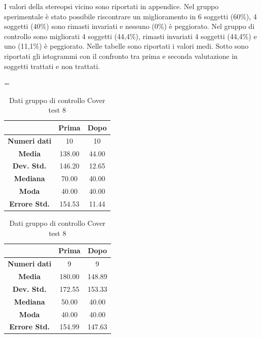 I valori della stereopsi vicino sono riportati in appendice. Nel gruppo sperimentale è stato possibile riscontrare un miglioramento in 6 soggetti (60\%), 4 soggetti (40\%) sono rimasti invariati e nessuno (0\%) è peggiorato. Nel gruppo di controllo sono migliorati 4 soggetti (44,4\%), rimasti invariati 4 soggetti (44,4\%) e uno (11,1\%) è peggiorato. Nelle tabelle sono riportati i valori medi. Sotto sono riportati gli istogrammi con il confronto tra prima e seconda valutazione in soggetti trattati e non trattati.

\begin{table}
\centering
\setlength\tabcolsep{4pt}
\begin{minipage}{0.48\textwidth}
\centering
\tablewidth=\textwidth

\begin{tabular}{|c|c|c|} \hline
{\textbf{}} & {\textbf{  \hspace{8pt}Prima\hspace{8pt} }} & {\textbf{ \hspace{8pt}Dopo\hspace{8pt}  }}\\ \hline
\textbf{Numeri dati} & 10 & 10 \\ 
\textbf{Media} & 138.00 & 44.00 \\  
\textbf{Dev. Std.} & 146.20 & 12.65 \\  
\textbf{Mediana} & 70.00 & 40.00 \\ 
\textbf{Moda} & 40.00 & 40.00 \\ 
\textbf{Errore Std.} & 154.53 & 11.44 \\ 
\hline
\end{tabular}
\caption{Dati gruppo sperimentale Cover test 8}

\label{tab:accuracy} 
\end{minipage}%
\hfill
\begin{minipage}{0.48\textwidth}
\centering

\begin{tabular}{|c|c|c|} \hline
{\textbf{}} & {\textbf{  \hspace{8pt}Prima\hspace{8pt} }} & {\textbf{ \hspace{8pt}Dopo\hspace{8pt}  }}\\ \hline
\textbf{Numeri dati} & 9 & 9 \\ 
\textbf{Media} & 180.00 & 148.89 \\  
\textbf{Dev. Std.} & 172.55 & 153.33 \\  
\textbf{Mediana} & 50.00 & 40.00 \\  
\textbf{Moda} & 40.00 & 40.00 \\
\textbf{Errore Std.} & 154.99 & 147.63 \\
\hline
\end{tabular}
\caption{Dati gruppo di controllo Cover test 8}

 \label{tab:ompdiff} 
\end{minipage}
\end{table}
